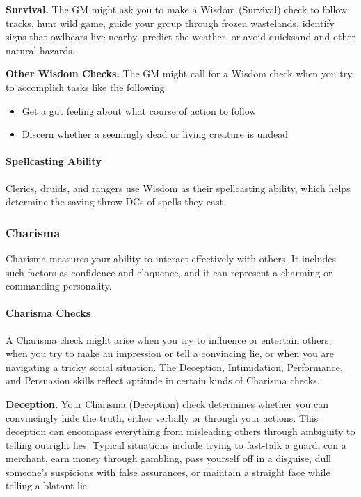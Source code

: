 \documentclass[
]{article}
\providecommand{\tightlist}{%
  \setlength{\itemsep}{0pt}\setlength{\parskip}{0pt}}
\begin{document}
\textbf{Survival.} The GM might ask you to make a Wisdom (Survival)
check to follow tracks, hunt wild game, guide your group through frozen
wastelands, identify signs that owlbears live nearby, predict the
weather, or avoid quicksand and other natural hazards.

\textbf{Other Wisdom Checks.} The GM might call for a Wisdom check when
you try to accomplish tasks like the following:

\begin{itemize}
\tightlist
\item
  Get a gut feeling about what course of action to follow
\item
  Discern whether a seemingly dead or living creature is undead
\end{itemize}

\hypertarget{spellcasting-ability-1}{%
\paragraph{Spellcasting Ability}\label{spellcasting-ability-1}}

Clerics, druids, and rangers use Wisdom as their spellcasting ability,
which helps determine the saving throw DCs of spells they cast.

\hypertarget{charisma-1}{%
\subsubsection{Charisma}\label{charisma-1}}

Charisma measures your ability to interact effectively with others. It
includes such factors as confidence and eloquence, and it can represent
a charming or commanding personality.

\hypertarget{charisma-checks}{%
\paragraph{Charisma Checks}\label{charisma-checks}}

A Charisma check might arise when you try to influence or entertain
others, when you try to make an impression or tell a convincing lie, or
when you are navigating a tricky social situation. The Deception,
Intimidation, Performance, and Persuasion skills reflect aptitude in
certain kinds of Charisma checks.

\textbf{Deception.} Your Charisma (Deception) check determines whether
you can convincingly hide the truth, either verbally or through your
actions. This deception can encompass everything from misleading others
through ambiguity to telling outright lies. Typical situations include
trying to fast-talk a guard, con a merchant, earn money through
gambling, pass yourself off in a disguise, dull someone's suspicions
with false assurances, or maintain a straight face while telling a
blatant lie.
\end{document}
